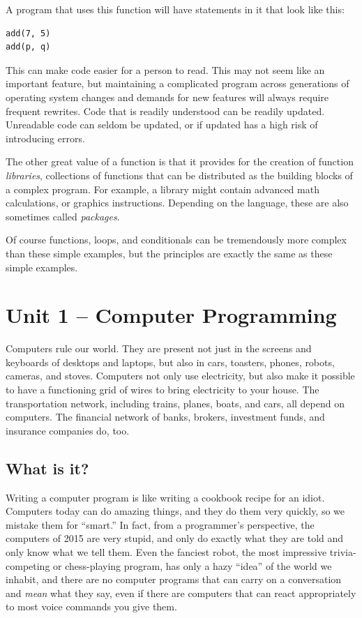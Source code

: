 \documentclass[11pt]{article}
\begin{document}
A program that uses this function will have statements in it that look
like this:

\begin{verbatim}
add(7, 5)
add(p, q)
\end{verbatim}

This can make code easier for a person to read.  This may not seem
like an important feature, but maintaining a complicated program
across generations of operating system changes and demands for new
features will always require frequent rewrites.  Code that is readily
understood can be readily updated.  Unreadable code can seldom be
updated, or if updated has a high risk of introducing errors.

The other great value of a function is that it provides for the
creation of function \emph{libraries}, collections of functions that
can be distributed as the building blocks of a complex program.  For
example, a library might contain advanced math calculations, or
graphics instructions.  Depending on the language, these are also
sometimes called \emph{packages}.

Of course functions, loops, and conditionals can be tremendously more
complex than these simple examples, but the principles are exactly the
same as these simple examples.


\section{Unit 1 -- Computer Programming}

Computers rule our world.  They are present not just in the screens
and keyboards of desktops and laptops, but also in cars, toasters,
phones, robots, cameras, and stoves.  Computers not only use
electricity, but also make it possible to have a functioning grid of
wires to bring electricity to your house.  The transportation network,
including trains, planes, boats, and cars, all depend on computers.
The financial network of banks, brokers, investment funds, and
insurance companies do, too.


\subsection{What is it?}

Writing a computer program is like writing a cookbook recipe for an
idiot.  Computers today can do amazing things, and they do them very
quickly, so we mistake them for ``smart.''  In fact, from a
programmer's perspective, the computers of 2015 are very stupid, and
only do exactly what they are told and only know what we tell them.
Even the fanciest robot, the most impressive trivia-competing or
chess-playing program, has only a hazy ``idea'' of the world we
inhabit, and there are no computer programs that can carry on a
conversation and \emph{mean} what they say, even if there are
computers that can react appropriately to most voice commands you give
them.
\end{document}
